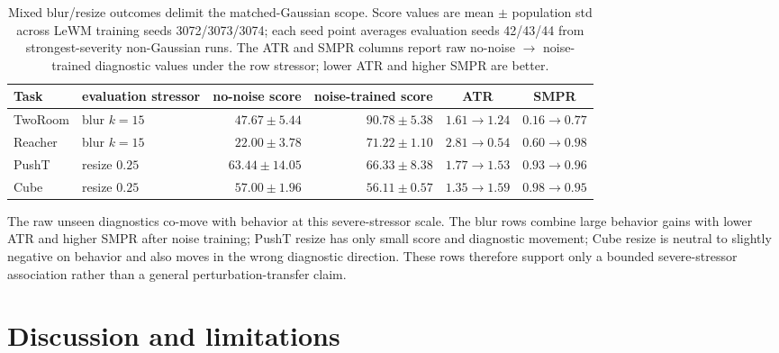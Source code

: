 \documentclass[10pt]{article}
\begin{document}
\begin{table}[htbp]
\centering
\caption{Mixed blur/resize outcomes delimit the matched-Gaussian scope. Score values are mean $\pm$ population std across LeWM training seeds 3072/3073/3074; each seed point averages evaluation seeds 42/43/44 from strongest-severity non-Gaussian runs. The ATR and SMPR columns report raw no-noise $\to$ noise-trained diagnostic values under the row stressor; lower ATR and higher SMPR are better.}
\label{tab:unseen-scope-main}
\small
\setlength{\tabcolsep}{3.5pt}
\begin{tabular}{llrrcc}
\toprule
Task & evaluation stressor & no-noise score & noise-trained score & ATR & SMPR \\
\midrule
TwoRoom & blur $k=15$ & $47.67 \pm 5.44$ & $90.78 \pm 5.38$ & $1.61 \to 1.24$ & $0.16 \to 0.77$ \\
Reacher & blur $k=15$ & $22.00 \pm 3.78$ & $71.22 \pm 1.10$ & $2.81 \to 0.54$ & $0.60 \to 0.98$ \\
PushT & resize $0.25$ & $63.44 \pm 14.05$ & $66.33 \pm 8.38$ & $1.77 \to 1.53$ & $0.93 \to 0.96$ \\
Cube & resize $0.25$ & $57.00 \pm 1.96$ & $56.11 \pm 0.57$ & $1.35 \to 1.59$ & $0.98 \to 0.95$ \\
\bottomrule
\end{tabular}
\end{table}

The raw unseen diagnostics co-move with behavior at this severe-stressor scale. The blur rows combine large behavior gains with lower ATR and higher SMPR after noise training; PushT resize has only small score and diagnostic movement; Cube resize is neutral to slightly negative on behavior and also moves in the wrong diagnostic direction. These rows therefore support only a bounded severe-stressor association rather than a general perturbation-transfer claim.

\FloatBarrier
\section{Discussion and limitations}\label{sec:disc}
\end{document}

